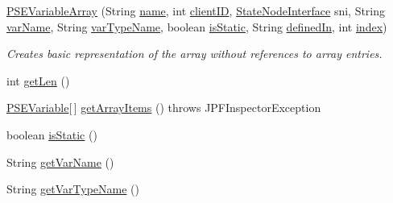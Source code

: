 \begin{DoxyCompactItemize}
\hyperlink{classgov_1_1nasa_1_1jpf_1_1inspector_1_1common_1_1pse_1_1_p_s_e_variable_array_a2becea68e256c8c03c2081b5b6ce2d37}{P\+S\+E\+Variable\+Array} (String \hyperlink{classgov_1_1nasa_1_1jpf_1_1inspector_1_1common_1_1pse_1_1_program_state_entry_a5fbdd37745a66317f1ea7738c3bda2a6}{name}, int \hyperlink{classgov_1_1nasa_1_1jpf_1_1inspector_1_1common_1_1pse_1_1_program_state_entry_a5743d1d799e3e1e864755f1040da1962}{client\+ID}, \hyperlink{interfacegov_1_1nasa_1_1jpf_1_1inspector_1_1server_1_1programstate_1_1_state_node_interface}{State\+Node\+Interface} sni, String \hyperlink{classgov_1_1nasa_1_1jpf_1_1inspector_1_1common_1_1pse_1_1_p_s_e_variable_ab22ccad7c4981bcadd0ddf2df3337689}{var\+Name}, String \hyperlink{classgov_1_1nasa_1_1jpf_1_1inspector_1_1common_1_1pse_1_1_p_s_e_variable_a646062a613747f6813b99f010f361222}{var\+Type\+Name}, boolean \hyperlink{classgov_1_1nasa_1_1jpf_1_1inspector_1_1common_1_1pse_1_1_p_s_e_variable_ad4f7133731afc14a4680c1928e960942}{is\+Static}, String \hyperlink{classgov_1_1nasa_1_1jpf_1_1inspector_1_1common_1_1pse_1_1_p_s_e_variable_a2dd10359feb7e7fcf3a6f93c32b76c03}{defined\+In}, int \hyperlink{classgov_1_1nasa_1_1jpf_1_1inspector_1_1common_1_1pse_1_1_p_s_e_variable_aa1c82f7362843f3926328cb30c5067cd}{index})
\begin{DoxyCompactList}\small\item\em Creates basic representation of the array without references to array entries. \end{DoxyCompactList}\item 
int \hyperlink{classgov_1_1nasa_1_1jpf_1_1inspector_1_1common_1_1pse_1_1_p_s_e_variable_array_a61b7d657d5a6b05a2125b949d566c369}{get\+Len} ()
\item 
\hyperlink{classgov_1_1nasa_1_1jpf_1_1inspector_1_1common_1_1pse_1_1_p_s_e_variable}{P\+S\+E\+Variable}\mbox{[}$\,$\mbox{]} \hyperlink{classgov_1_1nasa_1_1jpf_1_1inspector_1_1common_1_1pse_1_1_p_s_e_variable_array_a9262fd7f355857919266014982fe5927}{get\+Array\+Items} ()  throws J\+P\+F\+Inspector\+Exception 
\item 
boolean \hyperlink{classgov_1_1nasa_1_1jpf_1_1inspector_1_1common_1_1pse_1_1_p_s_e_variable_aabbed2b1c69ba2d76924bfa645a1502e}{is\+Static} ()
\item 
String \hyperlink{classgov_1_1nasa_1_1jpf_1_1inspector_1_1common_1_1pse_1_1_p_s_e_variable_ad1dc9e7dbc65a93af7c028831963c26f}{get\+Var\+Name} ()
\item 
String \hyperlink{classgov_1_1nasa_1_1jpf_1_1inspector_1_1common_1_1pse_1_1_p_s_e_variable_ae3ebfecacb0600cb08019e22c220d888}{get\+Var\+Type\+Name} ()

\end{DoxyCompactItemize}
